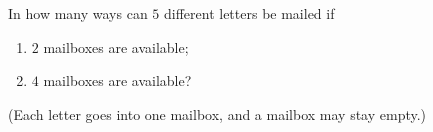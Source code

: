 In how many ways can $5$ different letters be mailed if
\begin{enumerate}
\item[(a)] $2$ mailboxes are available;
\item[(b)] $4$ mailboxes are available?
\end{enumerate}
(Each letter goes into one mailbox, and a mailbox may stay empty.)
